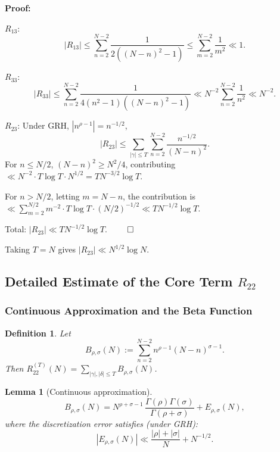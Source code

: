 \documentclass[11pt,a4paper]{article}
\newtheorem{lemma}[theorem]{Lemma}
\newtheorem{definition}[theorem]{Definition}
\theoremstyle{remark}
\begin{document}
\noindent\textbf{Proof:}

\noindent$R_{13}$:
\[
|R_{13}| \leq \sum_{n=2}^{N-2} \frac{1}{2((N-n)^2-1)} \leq \sum_{m=2}^{N-2} \frac{1}{m^2} \ll 1.
\]

\noindent$R_{33}$:
\[
|R_{33}| \leq \sum_{n=2}^{N-2} \frac{1}{4(n^2-1)((N-n)^2-1)} \ll N^{-2} \sum_{n=2}^{N-2} \frac{1}{n^2} \ll N^{-2}.
\]

\noindent$R_{23}$: Under GRH, $|n^{\rho-1}| = n^{-1/2}$,
\[
|R_{23}| \leq \sum_{|\gamma| \leq T} \sum_{n=2}^{N-2} \frac{n^{-1/2}}{(N-n)^2}.
\]
For $n \leq N/2$, $(N-n)^2 \geq N^2/4$, contributing $\ll N^{-2}\cdot T\log T \cdot N^{1/2} = T N^{-3/2}\log T$.

For $n > N/2$, letting $m = N-n$, the contribution is $\ll \sum_{m=2}^{N/2} m^{-2}\cdot T\log T \cdot (N/2)^{-1/2} \ll T N^{-1/2}\log T$.

Total: $|R_{23}| \ll T N^{-1/2}\log T$. $\qed$

Taking $T = N$ gives $|R_{23}| \ll N^{1/2}\log N$.

\subsection{Detailed Estimate of the Core Term $R_{22}$}

\subsubsection{Continuous Approximation and the Beta Function}

\begin{definition}\label{def:Brs}
Let
\begin{equation}\label{eq:Brs}
B_{\rho,\sigma}(N) := \sum_{n=2}^{N-2} n^{\rho-1}(N-n)^{\sigma-1}.
\end{equation}
Then $R_{22}^{(T)}(N) = \sum_{|\gamma|,|\delta| \leq T} B_{\rho,\sigma}(N)$.
\end{definition}

\begin{lemma}[Continuous approximation]\label{lem:continuous}
\begin{equation}\label{eq:continuous}
B_{\rho,\sigma}(N) = N^{\rho+\sigma-1}\, \frac{\Gamma(\rho)\Gamma(\sigma)}{\Gamma(\rho+\sigma)} + E_{\rho,\sigma}(N),
\end{equation}
where the discretization error satisfies (under GRH):
\begin{equation}\label{eq:Ers}
|E_{\rho,\sigma}(N)| \ll \frac{|\rho| + |\sigma|}{N} + N^{-1/2}.
\end{equation}
\end{lemma}
\end{document}
